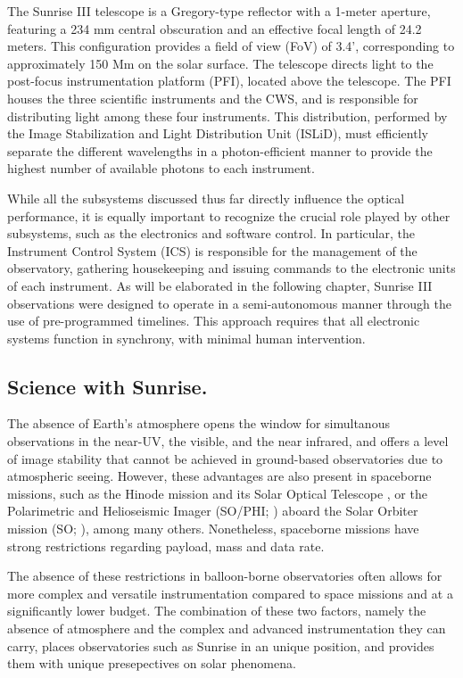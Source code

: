 The Sunrise III telescope is a Gregory-type reflector with a 1-meter aperture, featuring a 234 mm central obscuration and an effective focal length of 24.2 meters. This configuration provides a field of view (FoV) of 3.4', corresponding to approximately 150 Mm on the solar surface. The telescope directs light to the post-focus instrumentation platform (PFI), located above the telescope. The PFI houses the three scientific instruments and the CWS, and is responsible for distributing light among these four instruments. This distribution, performed by the Image Stabilization and Light Distribution Unit (ISLiD), must efficiently separate the different wavelengths in a photon-efficient manner to provide the highest number of available photons to each instrument. 

While all the subsystems discussed thus far directly influence the optical performance, it is equally important to recognize the crucial role played by other subsystems, such as the electronics and software control. In particular, the Instrument Control System (ICS) is responsible for the management of the observatory, gathering housekeeping and issuing commands to the electronic units of each instrument. As will be elaborated in the following chapter, Sunrise III observations were designed to operate in a semi-autonomous manner through the use of pre-programmed timelines. This approach requires that all electronic systems function in synchrony, with minimal human intervention. 

\subsection{Science with Sunrise.}

The absence of Earth's atmosphere opens the window for simultanous observations in the near-UV, the visible, and the near infrared, and offers a level of image stability that cannot be achieved in ground-based observatories due to atmospheric seeing. However, these advantages are also present in spaceborne missions, such as the Hinode mission \citep{Hinode} and its Solar Optical Telescope \citep{sot}, or the Polarimetric and Helioseismic Imager (SO/PHI; \citealt{PHI}) aboard the Solar Orbiter mission (SO; \citealt{SO}), among many others. Nonetheless, spaceborne missions have strong restrictions regarding payload, mass and data rate. 

The absence of these restrictions in balloon-borne observatories often allows for more complex and versatile instrumentation compared to space missions and at a significantly lower budget. The combination of these two factors, namely the absence of atmosphere and the complex and advanced instrumentation they can carry, places observatories such as Sunrise in an unique position, and provides them with unique presepectives on solar phenomena.

